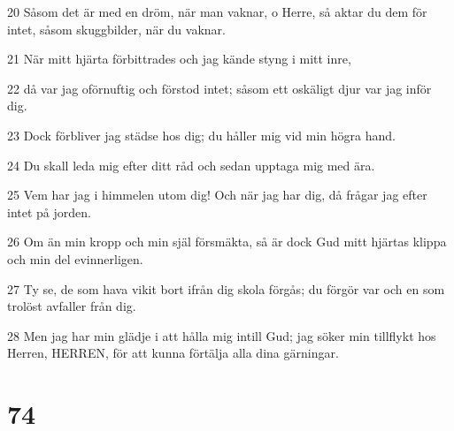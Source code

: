 \par 20 Såsom det är med en dröm, när man vaknar, o Herre, så aktar du dem för intet, såsom skuggbilder, när du vaknar.
\par 21 När mitt hjärta förbittrades och jag kände styng i mitt inre,
\par 22 då var jag oförnuftig och förstod intet; såsom ett oskäligt djur var jag inför dig.
\par 23 Dock förbliver jag städse hos dig; du håller mig vid min högra hand.
\par 24 Du skall leda mig efter ditt råd och sedan upptaga mig med ära.
\par 25 Vem har jag i himmelen utom dig! Och när jag har dig, då frågar jag efter intet på jorden.
\par 26 Om än min kropp och min själ försmäkta, så är dock Gud mitt hjärtas klippa och min del evinnerligen.
\par 27 Ty se, de som hava vikit bort ifrån dig skola förgås; du förgör var och en som trolöst avfaller från dig.
\par 28 Men jag har min glädje i att hålla mig intill Gud; jag söker min tillflykt hos Herren, HERREN, för att kunna förtälja alla dina gärningar.

\chapter{74}

